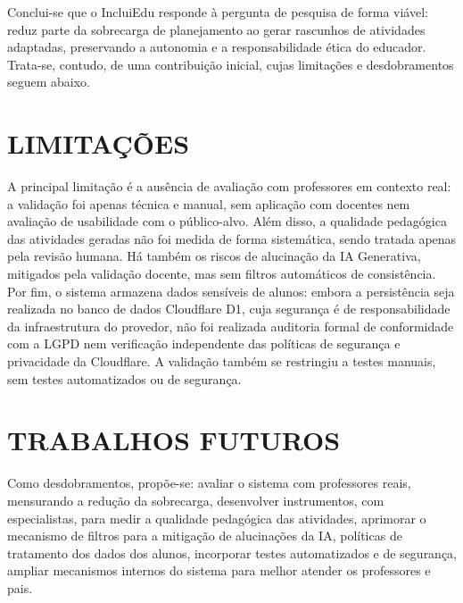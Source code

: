 Conclui-se que o IncluiEdu responde à pergunta de pesquisa de forma viável: reduz parte da sobrecarga de planejamento ao gerar rascunhos de atividades adaptadas, preservando a autonomia e a responsabilidade ética do educador. Trata-se, contudo, de uma contribuição inicial, cujas limitações e desdobramentos seguem abaixo.

\section{LIMITAÇÕES}

A principal limitação é a ausência de avaliação com professores em contexto real: a validação foi apenas técnica e manual, sem aplicação com docentes nem avaliação de usabilidade com o público-alvo. Além disso, a qualidade pedagógica das atividades geradas não foi medida de forma sistemática, sendo tratada apenas pela revisão humana. Há também os riscos de alucinação da IA Generativa, mitigados pela validação docente, mas sem filtros automáticos de consistência. Por fim, o sistema armazena dados sensíveis de alunos: embora a persistência seja realizada no banco de dados Cloudflare D1, cuja segurança é de responsabilidade da infraestrutura do provedor, não foi realizada auditoria formal de conformidade com a LGPD nem verificação independente das políticas de segurança e privacidade da Cloudflare. A validação também se restringiu a testes manuais, sem testes automatizados ou de segurança.

\section{TRABALHOS FUTUROS}

Como desdobramentos, propõe-se: avaliar o sistema com professores reais, mensurando a redução da sobrecarga, desenvolver instrumentos, com especialistas, para medir a qualidade pedagógica das atividades, aprimorar o mecanismo de filtros para a mitigação de alucinações da IA, políticas de tratamento dos dados dos alunos, incorporar testes automatizados e de segurança, ampliar mecanismos internos do sistema para melhor atender os professores e pais.